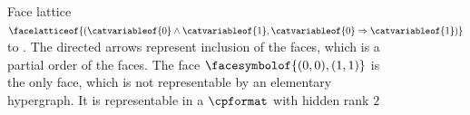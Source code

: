 \begin{example}
    \begin{figure}
        \begin{center}
            
        \end{center}
        \caption{
            Face lattice $\facelatticeof{(\catvariableof{0} \land \catvariableof{1},\catvariableof{0} \Rightarrow \catvariableof{1})}$ to .
            The directed arrows represent inclusion of the faces, which is a partial order of the faces.
            The face \textcolor{\concolor}{$\facesymbolof{(0,0),(1,1)}$} is the only face, which is not representable by an elementary hypergraph.
            It is representable in a $\cpformat$ with hidden rank $2$
        }\label{fig:latticeNonelHlnstat}
    \end{figure}

\end{example}